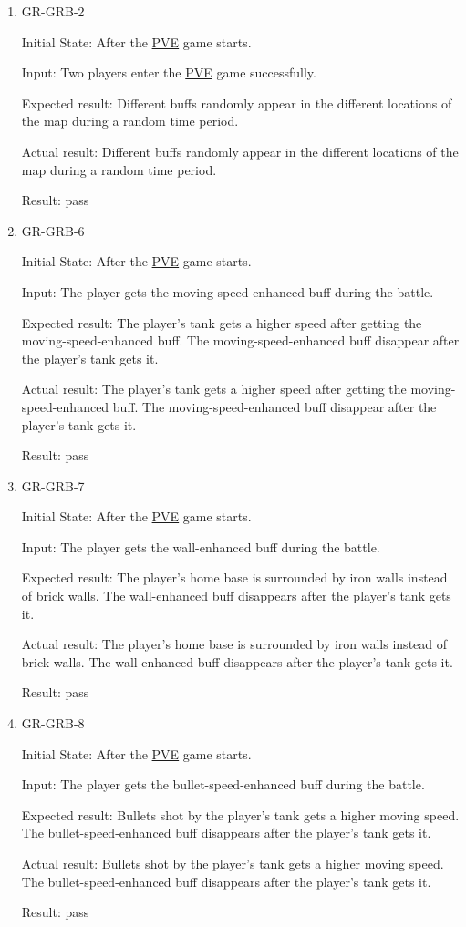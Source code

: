 \documentclass[12pt, titlepage]{article}
\begin{document}
\begin{enumerate}

\item{GR-GRB-2\\}
					
Initial State: After the \underline{PVE} game starts. 
					
Input: Two players enter the \underline{PVE} game successfully.
					
Expected result: Different buffs randomly appear in the different locations of the map during a random time period.
					
Actual result: Different buffs randomly appear in the different locations of the map during a random time period.

Result: pass

\item{GR-GRB-6\\}
					
Initial State: After the \underline{PVE} game starts. 
					
Input: The player gets the moving-speed-enhanced buff during the battle.
					
Expected result: The player's tank gets a higher speed after getting the moving-speed-enhanced buff. The moving-speed-enhanced buff disappear after the player's tank gets it.
					
Actual result: The player's tank gets a higher speed after getting the moving-speed-enhanced buff. The moving-speed-enhanced buff disappear after the player's tank gets it.

Result: pass

\item{GR-GRB-7\\}
					
Initial State: After the \underline{PVE} game starts. 
					
Input: The player gets the wall-enhanced buff during the battle.
					
Expected result: The player's home base is surrounded by iron walls instead of brick walls. The wall-enhanced buff disappears after the player's tank gets it.
					
Actual result: The player's home base is surrounded by iron walls instead of brick walls. The wall-enhanced buff disappears after the player's tank gets it.

Result: pass

\item{GR-GRB-8\\}
					
Initial State: After the \underline{PVE} game starts. 
					
Input: The player gets the bullet-speed-enhanced buff during the battle.
					
Expected result: Bullets shot by the player's tank gets a higher moving speed. The bullet-speed-enhanced buff disappears after the player's tank gets it.
					
Actual result: Bullets shot by the player's tank gets a higher moving speed. The bullet-speed-enhanced buff disappears after the player's tank gets it.

Result: pass

\end{enumerate}
\end{document}
